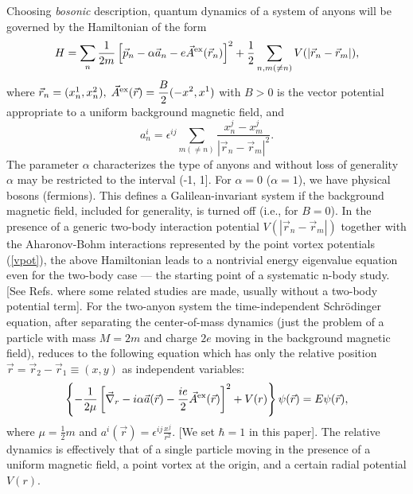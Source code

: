 \documentclass[a4paper,aps,eqsecnum,preprint,preprintnumbers,12pt]{revtex4}
\begin{document}
Choosing {\it bosonic} description, quantum dynamics of a system
of anyons will be governed by the Hamiltonian of the form
\cite{khare, lerda}
\begin{equation}
H = \sum_{n} \frac{1}{2m} \left[ \vec{p}_{n} - \alpha \vec{a}_{n}
- e \vec{A}^{\rm ex}(\vec{r}_{n}) \right]^{2} + \frac{1}{2}
\sum_{n,m(\neq n)} V(|\vec{r}_{n}-\vec{r}_{m}|),
\end{equation}
where $\vec{r}_{n} = ( x_{n}^{1} ,x_{n}^{2} ), \; \vec{A}^{\rm
ex}(\vec{r}) = \displaystyle \frac{B}{2} ( -x^{2}, x^{1} )$ with
$B>0$ is the vector potential appropriate to a uniform background
magnetic field, and
\begin{equation} \label{vpot}
a^{i}_{n} = \epsilon^{ij} \sum_{m(\neq n)}
\frac{x^{j}_{n}-x^{j}_{m}}{|\vec{r}_{n}-\vec{r}_{m}|^{2}}.
\end{equation}
The parameter $\alpha$ characterizes the type of anyons and
without loss of generality $\alpha$ may be restricted to the
interval (-1, 1]. For $\alpha=0$ ($\alpha=1$), we have physical
bosons (fermions). This defines a Galilean-invariant system if the
background magnetic field, included for generality, is turned off
(i.e., for $B=0$). In the presence of a generic two-body
interaction potential $V(|\vec{r}_{n}-\vec{r}_{m}|)$ together with
the Aharonov-Bohm interactions represented by the point vortex
potentials (\ref{vpot}), the above Hamiltonian leads to a
nontrivial energy eigenvalue equation even for the two-body case
--- the starting point of a systematic n-body study. [See Refs.
\cite{khare, lerda, johnson, wu, dunne} where some related studies
are made, usually without a two-body potential term]. For the
two-anyon system the time-independent Schr\"{o}dinger equation,
after separating the center-of-mass dynamics (just the problem of
a particle with mass $M=2m$ and charge $2e$ moving in the
background magnetic field), reduces to the following equation
which has only the relative position $\vec{r} = \vec{r}_{2} -
\vec{r}_{1} \equiv (x, y)$ as independent variables:
\begin{equation} \label{eom}
\left\{ -\frac{1}{2\mu} \left[ \vec{\nabla}_{r} - i \alpha
\vec{a}(\vec{r}) - \frac{ie}{2} \vec{A}^{\rm ex}(\vec{r})
\right]^{2} + V(r) \right\} \psi(\vec{r}) = E \psi(\vec{r}),
\end{equation}
where $\mu = \displaystyle \frac{1}{2} m$ and $a^{i}(\vec{r}) =
\epsilon^{ij} \displaystyle \frac{x^{j}}{r^{2}}$. [We set $\hbar =
1$ in this paper]. The relative dynamics is effectively that of a
single particle moving in the presence of a uniform magnetic
field, a point vortex at the origin, and a certain radial
potential $V(r)$.
\end{document}
